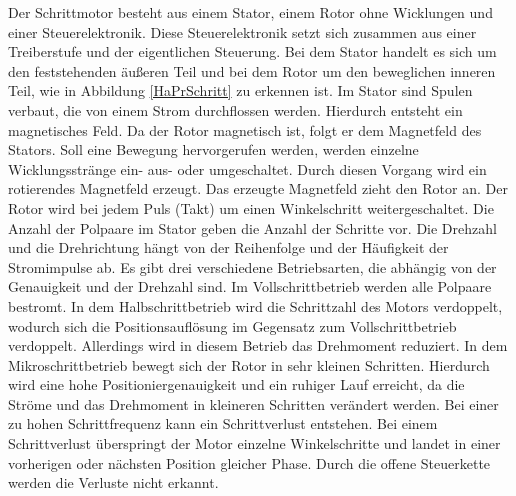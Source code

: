 Der Schrittmotor besteht aus einem Stator, einem Rotor ohne Wicklungen und einer Steuerelektronik. Diese Steuerelektronik setzt sich zusammen aus einer Treiberstufe und der eigentlichen Steuerung. Bei dem Stator handelt es sich um den feststehenden äußeren Teil und bei dem Rotor um den beweglichen inneren Teil, wie in Abbildung \ref{HaPrSchritt} zu erkennen ist. Im Stator sind Spulen verbaut, die von einem Strom durchflossen werden. Hierdurch entsteht ein magnetisches Feld. Da der Rotor magnetisch ist, folgt er dem Magnetfeld des Stators. Soll eine Bewegung hervorgerufen werden, werden einzelne Wicklungsstränge ein- aus- oder umgeschaltet. Durch diesen Vorgang wird ein rotierendes Magnetfeld erzeugt. Das erzeugte Magnetfeld zieht den Rotor an. Der Rotor wird bei jedem Puls (Takt) um einen Winkelschritt weitergeschaltet. Die Anzahl der Polpaare im Stator geben die Anzahl der Schritte vor. Die Drehzahl und die Drehrichtung hängt von der Reihenfolge und der Häufigkeit der Stromimpulse ab. Es gibt drei verschiedene Betriebsarten, die abhängig von der Genauigkeit und der Drehzahl sind. Im Vollschrittbetrieb werden alle Polpaare bestromt. In dem Halbschrittbetrieb wird die Schrittzahl des Motors verdoppelt, wodurch sich die Positionsauflösung im Gegensatz zum Vollschrittbetrieb verdoppelt. Allerdings wird in diesem Betrieb das Drehmoment reduziert. In dem Mikroschrittbetrieb bewegt sich der Rotor in sehr kleinen Schritten. Hierdurch wird eine hohe Positioniergenauigkeit und ein ruhiger Lauf erreicht, da die Ströme und das Drehmoment in kleineren Schritten verändert werden. Bei einer zu hohen Schrittfrequenz kann ein Schrittverlust entstehen. Bei einem Schrittverlust überspringt der Motor einzelne Winkelschritte und landet in einer vorherigen oder nächsten Position gleicher Phase. Durch die offene Steuerkette werden die Verluste nicht erkannt.\cite{Hagl:2021,Bernstein:2018,Schroeder:2021}

